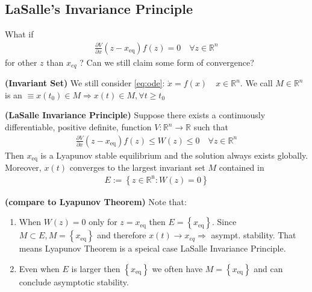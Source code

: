 \documentclass{article}
\newcommand{\bfs}[1]{\textbf{({#1}) }}
\begin{document}
\subsection{LaSalle’s Invariance Principle}
What if
\begin{align*}
\frac{\partial V}{\partial x}\left(z-x_{\mathrm {eq}}\right) f(z)=0 \quad \forall z \in \mathbb{R}^{n}
\end{align*}
for other $z$ than $x_{e q}$ ? Can we still claim some form of convergence?
\begin{defa}\bfs{Invariant Set}
We still consider \cref{eq:ode}: $\dot{x}=f(x) \quad x \in \mathbb{R}^{n}$.  We call
$M \in \mathbb{R}^{n}$ is an  $\equiv x\left(t_{0}\right) \in M \Rightarrow x(t) \in M, \forall t \geq t_{0}$
\end{defa}
\begin{thma}\bfs{LaSalle Invariance Principle}
Suppose there exists a continuously differentiable, positive definite,  function $V: \mathbb{R}^{n} \rightarrow \mathbb{R}$ such that
\begin{align*}
\frac{\partial V}{\partial x}\left(z-x_{\mathrm {eq}}\right) f(z) \leq W(z) \leq 0 \quad \forall z \in \mathbb{R}^{n}
\end{align*}
Then $x_{\mathrm{eq}}$ is a Lyapunov stable equilibrium and the solution always exists globally. Moreover, $x(t)$ converges to the largest invariant set $M$ contained in
\begin{align*}
E:=\left\{z \in \mathbb{R}^{\mathrm{n}}: W(z)=0\right\}
\end{align*}
\end{thma}
\begin{rema}\bfs{compare to Lyapunov Theorem}
Note that:
\begin{enumerate}
    \item When $W(z)=0$ only for $z=x_{\mathrm{eq}}$ then $E=\left\{x_{\mathrm{eq}}\right\}$.
Since $M \subset E, M=\left\{x_{\mathrm{eq}}\right\}$ and therefore $x(t) \rightarrow x_{e q} \Rightarrow$ asympt. stability. That means Lyapunov Theorem is a speical case LaSalle Invariance Principle.
\item Even when $E$ is larger then $\left\{x_{\mathrm{eq}}\right\}$ we often have $M=\left\{x_{\mathrm{eq}}\right\}$ and can conclude asymptotic stability.
\end{enumerate} 
\end{rema}
\end{document}
